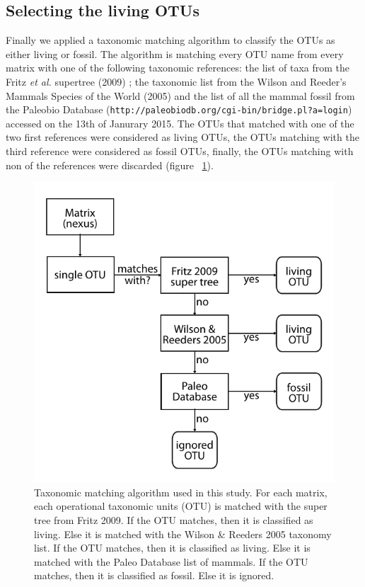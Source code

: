 \subsection{Selecting the living OTUs}
Finally we applied a taxonomic matching algorithm to classify the OTUs as either living or fossil. The algorithm is matching every OTU name from every matrix with one of the following taxonomic references: the list of taxa from the Fritz \textit{et al.} supertree (2009) \cite{FritzTree}; the taxonomic list from the Wilson and Reeder's Mammals Species of the World (2005) \cite{wilson2005mammal} and the list of all the mammal fossil from the Paleobio Database (\texttt{http://paleobiodb.org/cgi-bin/bridge.pl?a=login}) accessed on the 13th of Janurary 2015. The OTUs that matched with one of the two first references were considered as living OTUs, the OTUs matching with the third reference were considered as fossil OTUs, finally, the OTUs matching with non of the references were discarded (figure ~\ref{Supp_figure_Taxonomic_algorithm}).

\begin{figure}[!htbp]
\centering
    \includegraphics[width=1\textwidth]{Supplementary/Supp_figure_Taxonomic_algorithm.pdf}
\caption{Taxonomic matching algorithm used in this study. For each matrix, each operational taxonomic units (OTU) is matched with the super tree from Fritz 2009. If the OTU matches, then it is classified as living. Else it is matched with the Wilson \& Reeders 2005 taxonomy list. If the OTU matches, then it is classified as living. Else it is matched with the Paleo Database list of mammals. If the OTU matches, then it is classified as fossil. Else it is ignored.}
\label{Supp_figure_Taxonomic_algorithm}
\end{figure}

